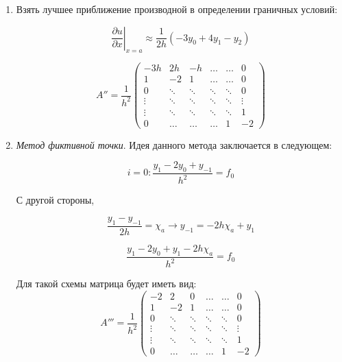 \documentclass[10pt,a4paper]{article}
\begin{document}
	\begin{enumerate}
		\item Взять лучшее приближение производной в определении граничных 
		условий:
	
	\begin{equation}
		\left.\frac{\partial u}{\partial x}\right|_{x = a} \approx 
		\frac{1}{2h}\left(-3y_{0} + 4y_{1} - y_{2}\right)
	\end{equation}
	
	\begin{equation}
			A'' = \frac{1}{h^{2}}\begin{pmatrix}
				-3h & 2h & -h & \ldots & \ldots &0 \\
				1 & -2 & 1 & \ldots & \ldots & 0 \\
				0& \ddots & \ddots &\ddots & \ddots & 0\\
				\vdots & \ddots & \ddots &\ddots & \ddots & \vdots\\
				\vdots & \ddots & \ddots &\ddots & \ddots & 1\\
				0 & \ldots & \ldots & \ldots & 1 & -2 
			\end{pmatrix}
	\end{equation}
	
	\item \textit{Метод фиктивной точки}. Идея данного метода заключается в 
	следующем:
	
	\begin{equation}
		i = 0: \frac{y_{1} - 2y_{0} + y_{-1}}{h^{2}} = f_{0}
	\end{equation}
	
	С другой стороны, 
	
	\begin{equation}
		\frac{y_{1} - y_{-1}}{2h} = \chi_{a} \rightarrow y_{-1} = -2h\chi_{a} + 
		y_{1}
	\end{equation}
	
	\begin{equation}
		\frac{y_{1} - 2y_{0} + y_{1} - 2h\chi_{a}}{h^{2}} = f_{0}
	\end{equation}
	
	Для такой схемы матрица будет иметь вид:
	\begin{equation}
			A''' = \frac{1}{h^{2}}\begin{pmatrix}
				-2 & 2 & 0 & \ldots & \ldots &0 \\
				1 & -2 & 1 & \ldots & \ldots & 0 \\
				0& \ddots & \ddots &\ddots & \ddots & 0\\
				\vdots & \ddots & \ddots &\ddots & \ddots & \vdots\\
				\vdots & \ddots & \ddots &\ddots & \ddots & 1\\
				0 & \ldots & \ldots & \ldots & 1 & -2 
			\end{pmatrix}
	\end{equation}
	
	\end{enumerate}
	
\end{document}
